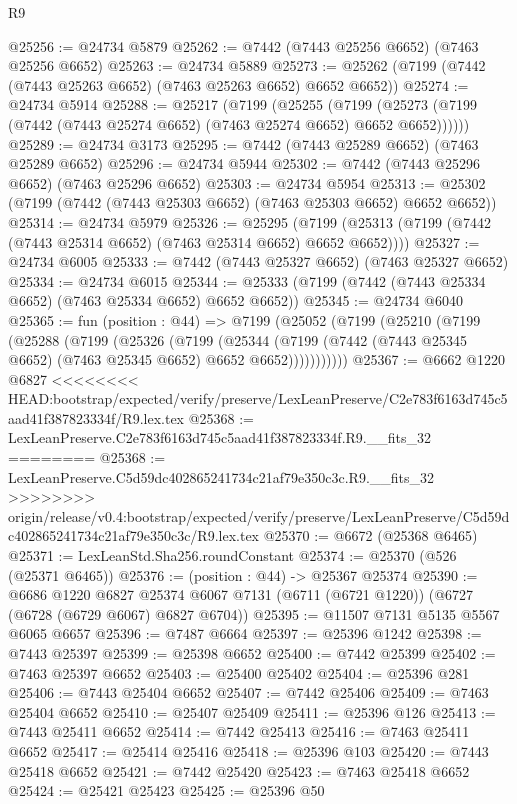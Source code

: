 \begin{lexlean}{R9}
\begin{coremodule}
{{{{{{{{{{{{{{{{{{{{{{{{{{{{{{{{{{{{{{{{{{{{{{{{{{{{{{{{{{{{{{{{{{{{{{{{{{{{{{{{{{{{@25256 := @24734 @5879
@25262 := @7442 (@7443 @25256 @6652) (@7463 @25256 @6652)
@25263 := @24734 @5889
@25273 := @25262 (@7199 (@7442 (@7443 @25263 @6652) (@7463 @25263 @6652) @6652 @6652))
@25274 := @24734 @5914
@25288 := @25217
    (@7199
      (@25255
        (@7199 (@25273 (@7199 (@7442 (@7443 @25274 @6652) (@7463 @25274 @6652) @6652 @6652))))))
@25289 := @24734 @3173
@25295 := @7442 (@7443 @25289 @6652) (@7463 @25289 @6652)
@25296 := @24734 @5944
@25302 := @7442 (@7443 @25296 @6652) (@7463 @25296 @6652)
@25303 := @24734 @5954
@25313 := @25302 (@7199 (@7442 (@7443 @25303 @6652) (@7463 @25303 @6652) @6652 @6652))
@25314 := @24734 @5979
@25326 := @25295
    (@7199 (@25313 (@7199 (@7442 (@7443 @25314 @6652) (@7463 @25314 @6652) @6652 @6652))))
@25327 := @24734 @6005
@25333 := @7442 (@7443 @25327 @6652) (@7463 @25327 @6652)
@25334 := @24734 @6015
@25344 := @25333 (@7199 (@7442 (@7443 @25334 @6652) (@7463 @25334 @6652) @6652 @6652))
@25345 := @24734 @6040
@25365 := fun (position : @44) =>
  @7199
    (@25052
      (@7199
        (@25210
          (@7199
            (@25288
              (@7199
                (@25326
                  (@7199
                    (@25344
                      (@7199 (@7442 (@7443 @25345 @6652) (@7463 @25345 @6652) @6652 @6652)))))))))))
@25367 := @6662 @1220 @6827
<<<<<<<< HEAD:bootstrap/expected/verify/preserve/LexLeanPreserve/C2e783f6163d745c5aad41f387823334f/R9.lex.tex
@25368 := LexLeanPreserve.C2e783f6163d745c5aad41f387823334f.R9.__fits_32
========
@25368 := LexLeanPreserve.C5d59dc402865241734c21af79e350c3c.R9.__fits_32
>>>>>>>> origin/release/v0.4:bootstrap/expected/verify/preserve/LexLeanPreserve/C5d59dc402865241734c21af79e350c3c/R9.lex.tex
@25370 := @6672 (@25368 @6465)
@25371 := LexLeanStd.Sha256.roundConstant
@25374 := @25370 (@526 (@25371 @6465))
@25376 := (position : @44) -> @25367 @25374
@25390 := @6686
    @1220
    @6827
    @25374
    @6067
    @7131
    (@6711 (@6721 @1220))
    (@6727 (@6728 (@6729 @6067) @6827 @6704))
@25395 := @11507 @7131 @5135 @5567 @6065 @6657
@25396 := @7487 @6664
@25397 := @25396 @1242
@25398 := @7443 @25397
@25399 := @25398 @6652
@25400 := @7442 @25399
@25402 := @7463 @25397 @6652
@25403 := @25400 @25402
@25404 := @25396 @281
@25406 := @7443 @25404 @6652
@25407 := @7442 @25406
@25409 := @7463 @25404 @6652
@25410 := @25407 @25409
@25411 := @25396 @126
@25413 := @7443 @25411 @6652
@25414 := @7442 @25413
@25416 := @7463 @25411 @6652
@25417 := @25414 @25416
@25418 := @25396 @103
@25420 := @7443 @25418 @6652
@25421 := @7442 @25420
@25423 := @7463 @25418 @6652
@25424 := @25421 @25423
@25425 := @25396 @50
}}}}}}}}}}}}}}}}}}}}}}}}}}}}}}}}}}}}}}}}}}}}}}}}}}}}}}}}}}}}}}}}}}}}}}}}}}}}}}}}}}}}
\end{coremodule}
\end{lexlean}

